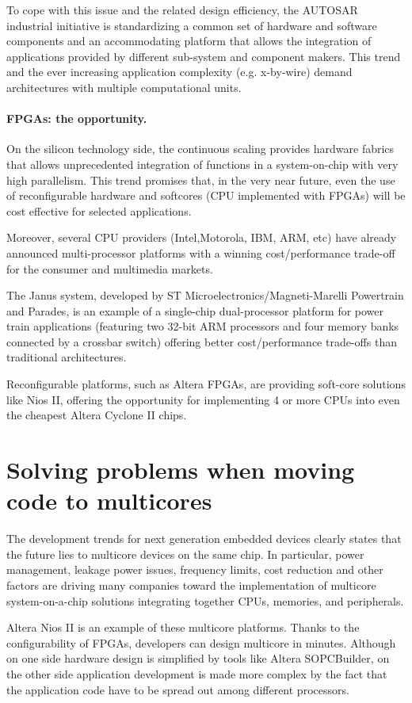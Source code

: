 To cope with this issue and the related design efficiency, the AUTOSAR
\cite{AUTOSAR} industrial initiative is standardizing a common set of
hardware and software components and an accommodating platform that
allows the integration of applications provided by different
sub-system and component makers. This trend and the ever increasing
application complexity (e.g. x-by-wire) demand architectures with
multiple computational units.

\paragraph{FPGAs: the opportunity.}
On the silicon technology side, the continuous scaling provides
hardware fabrics that allows unprecedented integration of functions in
a system-on-chip with very high parallelism. This trend promises that,
in the very near future, even the use of reconfigurable hardware and
softcores (CPU implemented with FPGAs) will be cost effective for
selected applications.

Moreover, several CPU providers (Intel,Motorola, IBM, ARM, etc) have
already announced multi-processor platforms with a winning
cost/performance trade-off for the consumer and multimedia markets.

The Janus system, developed by ST Microelectronics/Magneti-Marelli
Powertrain and Parades, is an example of a single-chip dual-processor
platform for power train applications (featuring two 32-bit ARM
processors and four memory banks connected by a crossbar switch)
offering better cost/performance trade-offs than traditional
architectures.

Reconfigurable platforms, such as Altera FPGAs, are providing soft-core
solutions like Nios II, offering the opportunity for implementing 4 or
more CPUs into even the cheapest Altera Cyclone II chips.


\section{Solving problems when moving code to multicores}
The development trends for next generation embedded devices clearly
states that the future lies to multicore devices on the same chip. In
particular, power management, leakage power issues, frequency limits,
cost reduction and other factors are driving many companies toward the
implementation of multicore system-on-a-chip solutions
integrating together CPUs, memories, and peripherals.

Altera Nios II is an example of these multicore
platforms. Thanks to the configurability of FPGAs, developers can
design multicore in minutes. Although on one side hardware
design is simplified by tools like Altera SOPCBuilder, on the other
side application development is made more complex by the fact that the
application code have to be spread out among different processors.

